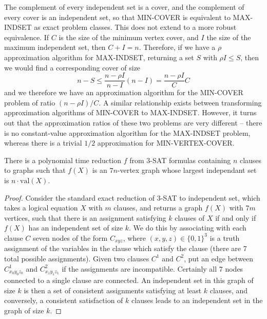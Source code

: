 The complement of every independent set is a cover, and the complement of every cover is an independent set, so that MIN-COVER is equivalent to MAX-INDSET as exact problem classes. This does not extend to a more robust equivalence. If $C$ is the size of the minimum vertex cover, and $I$ the size of the maximum independent set, then $C + I = n$. Therefore, if we have a $\rho$ approximation algorithm for MAX-INDSET, returning a set $S$ with $\rho I \leq S$, then we would find a corresponding cover of size
%
\[ n - S \leq \frac{n - \rho I}{n - I} (n - I) = \frac{n - \rho I}{C} C \]
%
and we therefore we have an approximation algorithm for the MIN-COVER problem of ratio $(n - \rho I)/C$. A similar relationship exists between transforming approximation algorithms of MIN-COVER to MAX-INDSET. However, it turns out that the approximation ratios of these two problems are very different -- there is no constant-value approximation algorithm for the MAX-INDSET problem, whereas there is a trivial $1/2$ approximation for MIN-VERTEX-COVER.

\begin{lemma}
    There is a polynomial time reduction $f$ from 3-SAT formulas containing $n$ clauses to graphs such that $f(X)$ is an $7n$-vertex graph whose largest independant set is $n \cdot \text{val}(X)$.
\end{lemma}
\begin{proof}
    Consider the standard exact reduction of 3-SAT to independent set, which takes a logical equation $X$ with $m$ clauses, and returns a graph $f(X)$ with $7m$ vertices, such that there is an assignment satisfying $k$ clauses of $X$ if and only if $f(X)$ has an independent set of size $k$. We do this by associating with each clause $C$ seven nodes of the form $C_{xyz}$, where $(x,y,z) \in \{ 0, 1 \}^3$ is a truth assignment of the variables in the clause which satisfy the clause (there are 7 total possible assignments). Given two clauses $C^1$ and $C^2$, put an edge between $C^1_{x_0y_0z_0}$ and $C^2_{x_1y_1z_1}$ if the assignments are incompatible. Certainly all 7 nodes connected to a single clause are connected. An independent set in this graph of size $k$ is then a set of consistent assignments satisfying at least $k$ clauses, and conversely, a consistent satisfaction of $k$ clauses leads to an independent set in the graph of size $k$.
\end{proof}

